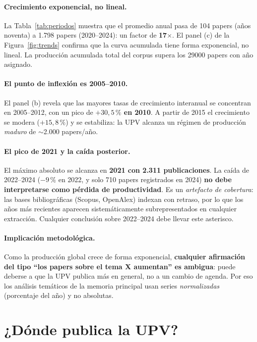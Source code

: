 \documentclass[11pt,a4paper]{article}
\newcommand{\good}[1]{\textbf{\textcolor{accent}{#1}}}
\begin{document}
\paragraph{Crecimiento exponencial, no lineal.} La Tabla~\ref{tab:periodos} muestra que el promedio anual pasa de 104 papers (años noventa) a 1.798 papers (2020--2024): un factor de \textbf{17$\times$}. El panel (c) de la Figura~\ref{fig:trends} confirma que la curva acumulada tiene forma exponencial, no lineal. La producción acumulada total del corpus supera los \num{29000} papers con año asignado.

\paragraph{El punto de inflexión es 2005--2010.} El panel (b) revela que las mayores tasas de crecimiento interanual se concentran en 2005--2012, con un pico de \good{$+30{,}5\,\%$ en 2010}. A partir de 2015 el crecimiento se modera ($+15{,}8\,\%$) y se estabiliza: la UPV alcanza un régimen de producción \emph{maduro} de $\sim$2.000 papers/año.

\paragraph{El pico de 2021 y la caída posterior.} El máximo absoluto se alcanza en \good{2021 con 2.311 publicaciones}. La caída de 2022--2024 ($-9\,\%$ en 2022, y solo 710 papers registrados en 2024) \textbf{no debe interpretarse como pérdida de productividad}. Es un \emph{artefacto de cobertura}: las bases bibliográficas (Scopus, OpenAlex) indexan con retraso, por lo que los años más recientes aparecen sistemáticamente subrepresentados en cualquier extracción. Cualquier conclusión sobre 2022--2024 debe llevar este asterisco.

\paragraph{Implicación metodológica.} Como la producción global crece de forma exponencial, \textbf{cualquier afirmación del tipo ``los papers sobre el tema X aumentan'' es ambigua}: puede deberse a que la UPV publica más en general, no a un cambio de agenda. Por eso los análisis temáticos de la memoria principal usan series \emph{normalizadas} (porcentaje del año) y no absolutas.

\section{¿Dónde publica la UPV?}
\end{document}
